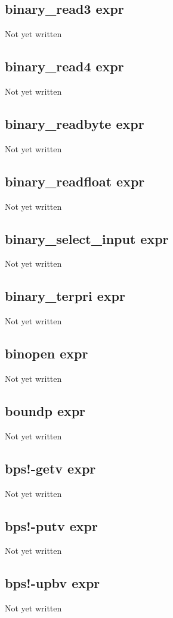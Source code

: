\documentclass[a4paper,11pt]{article}
\begin{document}
\subsection{\ttfamily binary\_read3 expr}
Not yet written

\subsection{\ttfamily binary\_read4 expr}
Not yet written

\subsection{\ttfamily binary\_readbyte expr}
Not yet written

\subsection{\ttfamily binary\_readfloat expr}
Not yet written

\subsection{\ttfamily binary\_select\_input expr}
Not yet written

\subsection{\ttfamily binary\_terpri expr}
Not yet written

\subsection{\ttfamily binopen expr}
Not yet written

\subsection{\ttfamily boundp expr}
Not yet written

\subsection{\ttfamily bps!-getv expr}
Not yet written

\subsection{\ttfamily bps!-putv expr}
Not yet written

\subsection{\ttfamily bps!-upbv expr}
Not yet written
\end{document}
